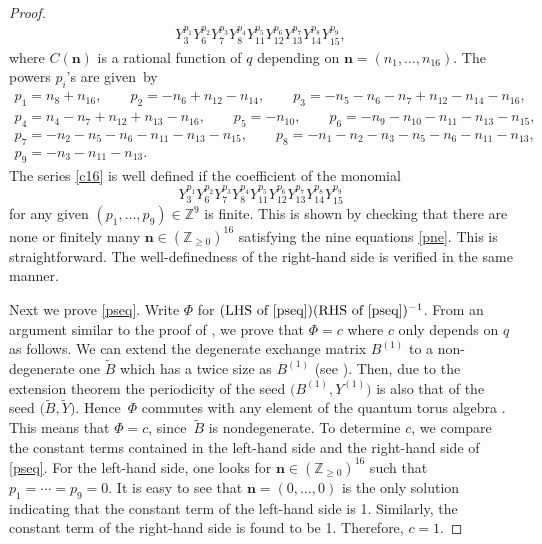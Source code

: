 \documentclass[11pt]{article}
\numberwithin{equation}{section}
\newcommand{\Z}{{\mathbb Z}}
\numberwithin{equation}{section}
\begin{document}
\begin{proof}
\begin{gather}
 Y_3^{p_1} Y_6^{p_2} Y_7^{p_3} Y_8^{p_4} Y_{11}^{p_5} Y_{12}^{p_6} Y_{13}^{p_7} Y_{14}^{p_8}Y_{15}^{p_9},\label{c16}
 \end{gather}
 where $C(\mathbf{n})$ is a rational function of $q$ depending on
 $\mathbf{n}=(n_1, \dotsc, n_{16})$. The powers $p_i$'s are given~by
\begin{gather}
p_1 = n_8+n_{16},\qquad p_2 = -n_6+n_{12}-n_{14},\qquad p_3 = -n_{5} - n_{6} - n_{7} + n_{12}-n_{14}-n_{16},
\nonumber\\
p_4 = n_4-n_7+n_{12}+n_{13}-n_{16}, \qquad
p_5 = -n_{10},
 \qquad p_6 = -n_9-n_{10}-n_{11}-n_{13}-n_{15},
\nonumber\\
 p_7 = -n_2-n_5-n_{6}-n_{11}-n_{13}-n_{15},
\qquad
 p_8 = -n_1 -n_2-n_3-n_5-n_6 - n_{11}-n_{13},\nonumber\\
 p_9 = -n_3-n_{11}-n_{13}.
\label{pne}
\end{gather}
The series \eqref{c16} is well defined if the coefficient of the monomial
\[
Y_3^{p_1} Y_6^{p_2} Y_7^{p_3} Y_8^{p_4} Y_{11}^{p_5} Y_{12}^{p_6} Y_{13}^{p_7} Y_{14}^{p_8} Y_{15}^{p_9}
\]
for any given $(p_1,\dotsc, p_9) \in \Z^9$ is finite.
This is shown by checking that there are none or finitely many
$\mathbf{n} \in (\Z_{\ge 0})^{16}$
satisfying the nine equations \eqref{pne}.
This is straightforward.
The well-definedness of the right-hand side is verified in the same manner.


Next we prove \eqref{pseq}.
Write $\Phi$ for $(\text{LHS of \eqref{pseq}})(\text{RHS of
\eqref{pseq}})^{-1}$.
From an argument similar to the proof of \cite[Theorem~3.5]{KN11}, we prove
that $\Phi= c$ where $c$ only depends on $q$ as follows.
We can extend the degenerate exchange matrix $B^{(1)}$ to a non-degenerate one
$\tilde{B}$ which has a twice size as $B^{(1)}$ (see \cite[Example 2.5]{KN11}).
Then, due to the extension theorem \cite[Theorem~4.3]{N11} the
periodicity of the seed $\bigl(B^{(1)},Y^{(1)}\bigr)$ is also that of the seed
$\bigl(\tilde{B},\tilde{Y}\bigr)$. Hence~$\Phi$ commutes with any element of the quantum torus algebra
. This means that $\Phi=c$, since~$\tilde{B}$
is nondegenerate.
To determine $c$, we compare the constant terms contained in the
left-hand side and the right-hand side of \eqref{pseq}. For the left-hand side, one looks for
$\mathbf{n} \in (\Z_{\ge 0})^{16}$ such that $p_1 = \dotsb = p_9 = 0$.
It is easy to see that $\mathbf{n}=(0,\dotsc, 0)$ is the only solution
indicating that the constant term of the left-hand side is 1. Similarly, the
constant term of the right-hand side is found to be 1. Therefore, $c=1$.
\end{proof}
\end{document}
